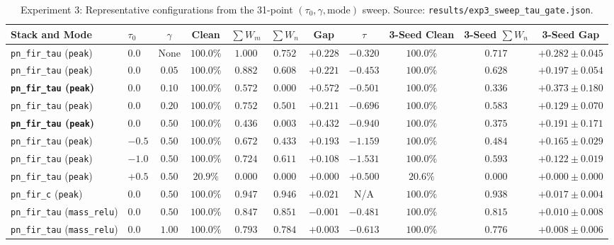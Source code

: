 \documentclass[11pt,a4paper]{article}
\begin{document}
\begin{table}[ht!]
\centering
\caption{Experiment 3: Representative configurations from the 31-point $(\tau_0, \gamma, \text{mode})$ sweep. Source: \texttt{results/exp3\_sweep\_tau\_gate.json}.}
\label{tab:exp3}
\scriptsize
\setlength{\tabcolsep}{2.2pt}
\begin{tabular}{llccccccccc}
\toprule
Stack and Mode & $\tau_0$ & $\gamma$ & Clean & $\sum W_m$ & $\sum W_n$ & Gap & $\tau$ & 3-Seed Clean & 3-Seed $\sum W_n$ & 3-Seed Gap \\
\midrule
\texttt{pn\_fir\_tau} (\texttt{peak}) & $0.0$ & None & $100.0\%$ & $1.000$ & $0.752$ & $+0.228$ & $-0.320$ & $100.0\%$ & $0.717$ & $+0.282 \pm 0.045$ \\
\texttt{pn\_fir\_tau} (\texttt{peak}) & $0.0$ & $0.05$ & $100.0\%$ & $0.882$ & $0.608$ & $+0.221$ & $-0.453$ & $100.0\%$ & $0.628$ & $+0.197 \pm 0.054$ \\
\textbf{\texttt{pn\_fir\_tau} (\texttt{peak})} & $\mathbf{0.0}$ & $\mathbf{0.10}$ & $\mathbf{100.0\%}$ & $\mathbf{0.572}$ & $\mathbf{0.000}$ & $\mathbf{+0.572}$ & $\mathbf{-0.501}$ & $\mathbf{100.0\%}$ & $\mathbf{0.336}$ & $\mathbf{+0.373 \pm 0.180}$ \\
\texttt{pn\_fir\_tau} (\texttt{peak}) & $0.0$ & $0.20$ & $100.0\%$ & $0.752$ & $0.501$ & $+0.211$ & $-0.696$ & $100.0\%$ & $0.583$ & $+0.129 \pm 0.070$ \\
\textbf{\texttt{pn\_fir\_tau} (\texttt{peak})} & $\mathbf{0.0}$ & $\mathbf{0.50}$ & $\mathbf{100.0\%}$ & $\mathbf{0.436}$ & $\mathbf{0.003}$ & $\mathbf{+0.432}$ & $\mathbf{-0.940}$ & $\mathbf{100.0\%}$ & $\mathbf{0.375}$ & $\mathbf{+0.191 \pm 0.171}$ \\
\texttt{pn\_fir\_tau} (\texttt{peak}) & $-0.5$ & $0.50$ & $100.0\%$ & $0.672$ & $0.433$ & $+0.193$ & $-1.159$ & $100.0\%$ & $0.484$ & $+0.165 \pm 0.029$ \\
\texttt{pn\_fir\_tau} (\texttt{peak}) & $-1.0$ & $0.50$ & $100.0\%$ & $0.724$ & $0.611$ & $+0.108$ & $-1.531$ & $100.0\%$ & $0.593$ & $+0.122 \pm 0.019$ \\
\texttt{pn\_fir\_tau} (\texttt{peak}) & $+0.5$ & $0.50$ & $20.9\%$ & $0.000$ & $0.000$ & $+0.000$ & $+0.500$ & $20.6\%$ & $0.000$ & $+0.000 \pm 0.000$ \\
\texttt{pn\_fir\_c} (\texttt{peak}) & $0.0$ & $0.50$ & $100.0\%$ & $0.947$ & $0.946$ & $+0.021$ & N/A & $100.0\%$ & $0.938$ & $+0.017 \pm 0.004$ \\
\texttt{pn\_fir\_tau} (\texttt{mass\_relu}) & $0.0$ & $0.50$ & $100.0\%$ & $0.847$ & $0.851$ & $-0.001$ & $-0.481$ & $100.0\%$ & $0.815$ & $+0.010 \pm 0.008$ \\
\texttt{pn\_fir\_tau} (\texttt{mass\_relu}) & $0.0$ & $1.00$ & $100.0\%$ & $0.793$ & $0.784$ & $+0.003$ & $-0.613$ & $100.0\%$ & $0.776$ & $+0.008 \pm 0.006$ \\
\bottomrule
\end{tabular}
\end{table}
\end{document}
